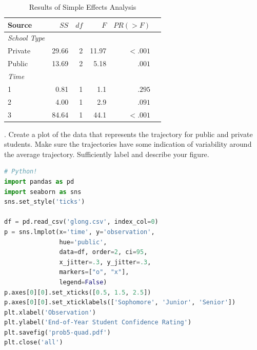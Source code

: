 \documentclass[onecolumn,10pt]{jhwhw}
\begin{document}

\begin{table}[h!]
\begin{center}
\begin{tabular}{l r r r r r}
\toprule
Source & $SS$ & $df$ & $F$ & $PR(>F)$ \\
\midrule
\it{School Type} & & & & \\
\hspace{1em} Private     & 29.66 &  2  & 11.97 & $<.001$ \\
\hspace{1em} Public      & 13.69 &  2  &  5.18 & $ .001$ \\
\it{Time} & & & & \\
\hspace{1em} 1      &  0.81 &  1  &  1.1 & $ .295$\\
\hspace{1em} 2      &  4.00 &  1  &  2.9 & $ .091$\\
\hspace{1em} 3      & 84.64 &  1  & 44.1 & $<.001$\\
\bottomrule
\end{tabular}
\end{center}
\caption{Results of Simple Effects Analysis}
\end{table}

\clearpage
{}. Create a plot of the data that represents the trajectory for public and private students. Make sure the trajectories have some indication of variability around the average trajectory. Sufficiently label and describe your figure.\\

\begin{lstlisting}[language=Python]
# Python!
import pandas as pd
import seaborn as sns
sns.set_style('ticks')

df = pd.read_csv('glong.csv', index_col=0)
p = sns.lmplot(x='time', y='observation',
               hue='public',
               data=df, order=2, ci=95,
               x_jitter=.3, y_jitter=.3,
               markers=["o", "x"],
               legend=False)
p.axes[0][0].set_xticks([0.5, 1.5, 2.5])
p.axes[0][0].set_xticklabels(['Sophomore', 'Junior', 'Senior'])
plt.xlabel('Observation')
plt.ylabel('End-of-Year Student Confidence Rating')
plt.savefig('prob5-quad.pdf')
plt.close('all')
\end{lstlisting}
\end{document}
